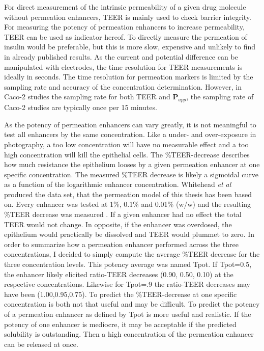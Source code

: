 For direct measurement of the intrinsic permeability of a given drug molecule without permeation enhancers, TEER is mainly used to check barrier integrity. For measuring the potency of permeation enhancers to increase permeability, TEER can be used as indicator hereof. To directly measure the permeation of insulin would be preferable, but this is more slow, expensive and unlikely to find in already published results. As the current and potential difference can be manipulated with electrodes, the time resolution for TEER measurements is ideally in seconds. The time resolution for permeation markers is limited by the sampling rate and accuracy of the concentration determination. However, in Caco-2 studies the sampling rate for both TEER and $\bm{P}_{app}$, the sampling rate of Caco-2 studies are typically once per 15 minutes.

As the potency of permeation enhancers can vary greatly, it is not meaningful to test all enhancers by the same concentration. Like a under- and over-exposure in photography, a too low concentration will have no measurable effect and a too high concentration will kill the epithelial cells. The \%TEER-decrease describes how much resistance the epithelium looses by a given permeation enhancer at one specific concentration. The measured \%TEER decrease is likely a sigmoidal curve as a function of the logarithmic enhancer concentration. Whitehead \textit{et al} produced the data set, that the permeation model of this thesis has been based on. Every enhancer was tested at 1\%, 0.1\% and 0.01\% (w/w) and the resulting \%TEER decrease was measured \cite{whitehead2008safe}. If a given enhancer had no effect the total TEER would not change. In opposite, if the enhancer was overdosed, the epithelium would practically be dissolved and TEER would plummet to zero. In order to summarize how a permeation enhancer performed across the three concentrations, I decided to simply compute the average \%TEER decrease for the three concentration levels. This potency average was named Tpot. If Tpot=0.5, the enhancer likely elicited ratio-TEER decreases (0.90, 0.50, 0.10) at the respective concentrations. Likewise for Tpot=.9 the ratio-TEER decreases may have been (1.00,0.95,0.75). To predict the \%TEER-decrease at one specific concentration is both not that useful and may be difficult. To predict the potency of a permeation enhancer as defined by Tpot is more useful and realistic. If the potency of one enhancer is mediocre, it may be acceptable if the predicted solubility is outstanding. Then a high concentration of the permeation enhancer can be released at once.

